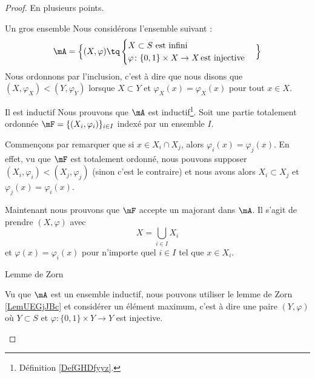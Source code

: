 \begin{proof}
    En plusieurs points.
    \begin{subproof}
        \item[Un gros ensemble]
            Nous considérons l'ensemble suivant :
                \begin{equation}
                   \mA=\Big\{  (X,\varphi)  \tq
                    \begin{cases}
                        X\subset S\text{ est infini}\\
                        \varphi\colon \{ 0,1 \}\times X\to X\,\text{est injective}
                    \end{cases}
                \Big\}
                \end{equation}
            Nous ordonnons par l'inclusion, c'est à dire que nous disons que \( (X,\varphi_X)<(Y,\varphi_Y)\) lorsque \( X\subset Y\) et \( \varphi_X(x)=\varphi_X(x)\) pour tout \( x\in X\).
        \item[Il est inductif]
            Nous prouvons que \( \mA\) est inductif\footnote{Définition \ref{DefGHDfyyz}.}. Soit une partie totalement ordonnée \( \mF=\{ (X_i,\varphi_i) \}_{i\in I}\) indexé par un ensemble \( I\).

            Commençons par remarquer que si \( x\in X_i\cap X_j\), alors \( \varphi_i(x)=\varphi_j(x)\). En effet, vu que \( \mF\) est totalement ordonné, nous pouvons supposer \( (X_i,\varphi_i)<(X_j,\varphi_j)\) (sinon c'est le contraire) et nous avons alors \( X_i\subset X_j\) et \( \varphi_j(x)=\varphi_i(x)\).

            Maintenant nous prouvons que \( \mF\) accepte un majorant dans \( \mA\). Il s'agit de prendre \( (X,\varphi)\) avec
            \begin{equation}
                X=\bigcup_{i\in I}X_i
            \end{equation}
            et \( \varphi(x)=\varphi_i(x)\) pour n'importe quel \( i\in I\) tel que \( x\in X_i\).

        \item[Lemme de Zorn]

            Vu que \( \mA\) est un ensemble inductif, nous pouvons utiliser le lemme de Zorn \ref{LemUEGjJBc} et considérer un élément maximum, c'est à dire une paire \( (Y,\varphi)\) où \( Y\subset S\) et \( \varphi\colon \{ 0,1 \}\times Y\to Y\) est injective.


\end{subproof}
\end{proof}
